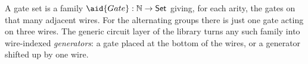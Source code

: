 A gate set is a family $\aid{Gate} : \mathbb{N} \to \mathsf{Set}$ giving, for each arity, the gates on that many adjacent wires. For the alternating groups there is just one gate acting on three wires. The generic circuit layer of the library turns any such family into wire-indexed \emph{generators}: a gate placed at the bottom of the wires, or a generator shifted up by one wire.
\begin{center}
\begin{minipage}[c]{0.8\linewidth}
\begingroup\setlength{\mathindent}{0pt}
\begin{code}%
\>[0]\AgdaSpace{}%
\AgdaSpace{}%
\AgdaSymbol{:}\AgdaSpace{}%
\AgdaSpace{}%
\AgdaSpace{}%
\AgdaSpace{}%
\<%
\\
\>[0][@{}l@{\AgdaIndent{0}}]%
\>[2]\AgdaSpace{}%
\AgdaSymbol{:}\AgdaSpace{}%
\AgdaSpace{}%
\<%
\\
\>[0]\AgdaSpace{}%
\AgdaSpace{}%
\AgdaSymbol{:}\AgdaSpace{}%
\AgdaSpace{}%
\AgdaSpace{}%
\AgdaSpace{}%
\<%
\\
\>[0][@{}l@{\AgdaIndent{0}}]%
\>[2]\AgdaSpace{}%
\AgdaSymbol{:}\AgdaSpace{}%
\AgdaSpace{}%
\AgdaSpace{}%
\AgdaSpace{}%
\AgdaSpace{}%
%
\>[34]\<%
\\
%
\>[2]\AgdaSpace{}%
\AgdaSymbol{:}\AgdaSpace{}%
\AgdaSpace{}%
\AgdaSpace{}%
\AgdaSpace{}%
\AgdaSpace{}%
\AgdaSymbol{(}\AgdaSpace{}%
\AgdaSymbol{)}%
\>[34]\<%
\\
%
\>[2]\AgdaSpace{}%
\AgdaSymbol{:}\AgdaSpace{}%
\AgdaSpace{}%
\AgdaSpace{}%
\AgdaSpace{}%
\AgdaSpace{}%
\AgdaSymbol{(}\AgdaSpace{}%
\AgdaSymbol{)}%
\>[34]\<%
\\
%
\>[2]\AgdaSpace{}%
\AgdaSymbol{:}\AgdaSpace{}%
\AgdaSpace{}%
\AgdaSpace{}%
\AgdaSpace{}%

\end{code}
\end{minipage}
\end{center}
